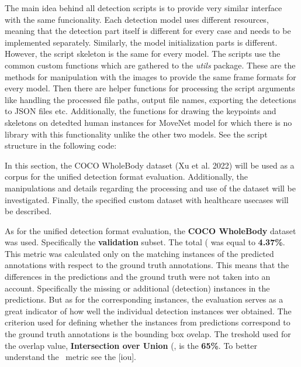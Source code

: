 The main idea behind all detection scripts is to provide very similar interface with the same funcionality. Each detection model uses different resources, meaning that the detection part itself is different for every case and needs to be implemented separately. Similarly, the model initialization parts is different. However, the script skeleton is the same for every model. The scripts use the common custom functions which are gathered to the {\em utils} package. These are the methods for manipulation with the images to provide the same frame formats for every model. Then there are helper functions for processing the script arguments like handling the processed file paths, output file names, exporting the detections to JSON files etc. Additionally, the functions for drawing the keypoints and skeletons on detedted human instances for MoveNet model for which there is no library with this functionality unlike the other two models. See the script structure in the following code:


In this section, the COCO WholeBody dataset (Xu et al. 2022) will be used as a corpus for the unified detection format evaluation. Additionally, the manipulations and details regarding the processing and use of the dataset will be investigated. Finally, the specified custom dataset with healthcare usecases will be described.

As for the unified detection format evaluation, the {\bf COCO WholeBody} dataset was used. Specifically the {\bf validation} subset. The total (\APE\) was equal to {\bf 4.37\%}. This metric was calculated only on the matching instances of the predicted annotations with respect to the ground truth annotations. This means that the differences in the predictions and the ground truth were not taken into an account. Specifically the missing or additional (detection) instances in the predictions. But as for the corresponding instances, the evaluation serves as a great indicator of how well the individual detection instances wer obtained. The criterion used for defining whether the instances from predictions correspond to the ground truth annotations is the bounding box ovelap. The treshold used for the overlap value, {\bf Intersection over Union} (\IoU\), is the {\bf 65\%}. To better understand the \IoU\ metric see the [iou].

